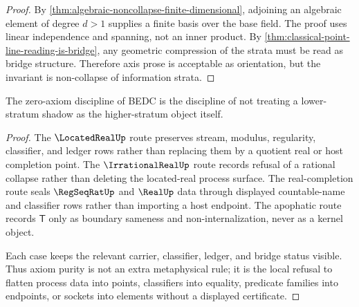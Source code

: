 \begin{proof}
By \autoref{thm:algebraic-noncollapse-finite-dimensional}, adjoining an
algebraic element of degree $d>1$ supplies a finite basis over the base
field.  The proof uses linear independence and spanning, not an inner
product.  By \autoref{thm:classical-point-line-reading-is-bridge}, any
geometric compression of the strata must be read as bridge structure.
Therefore axis prose is acceptable as orientation, but the invariant is
non-collapse of information strata.
\end{proof}

\begin{theorem}
\label{thm:axiom-purity-preserves-information-strata}
The zero-axiom discipline of BEDC is the discipline of not treating a
lower-stratum shadow as the higher-stratum object itself.
\end{theorem}

\begin{proof}
The $\LocatedRealUp$ route preserves stream, modulus, regularity,
classifier, and ledger rows rather than replacing them by a quotient real or
host completion point.  The $\IrrationalRealUp$ route records refusal of a
rational collapse rather than deleting the located-real process surface.  The
real-completion route seals $\RegSeqRatUp$ and $\RealUp$ data through
displayed countable-name and classifier rows rather than importing a host
endpoint.  The apophatic route records $\mathsf{T}$ only as boundary
sameness and non-internalization, never as a kernel object.

Each case keeps the relevant carrier, classifier, ledger, and bridge status
visible.  Thus axiom purity is not an extra metaphysical rule; it is the
local refusal to flatten process data into points, classifiers into equality,
predicate families into endpoints, or sockets into elements without a
displayed certificate.
\end{proof}


